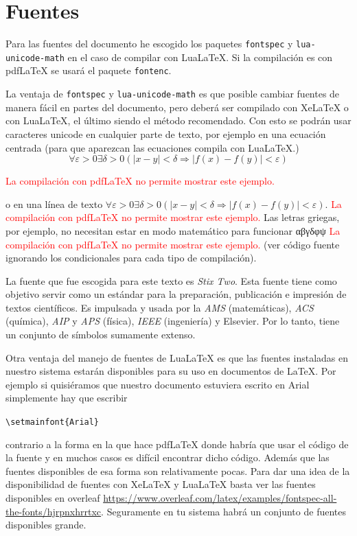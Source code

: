 
\chapter{Fuentes}
Para las fuentes del documento he escogido los paquetes \texttt{fontspec} y
\texttt{lua-unicode-math} en el caso de compilar con Lua\LaTeX. Si la
compilación es con pdf\LaTeX{} se usará el paquete \texttt{fontenc}.

La ventaja de \texttt{fontspec} y \texttt{lua-unicode-math} es que posible
cambiar fuentes de manera fácil en partes del documento, pero deberá ser
compilado con Xe\LaTeX{} o con Lua\LaTeX, el último siendo el método
recomendado. Con esto se podrán usar caracteres unicode en cualquier parte
de texto, por ejemplo en una ecuación centrada (para que aparezcan las
ecuaciones compila con Lua\LaTeX.)
\ifluatex%
\[
  ∀ε>0∃δ>0(|x-y|<δ ⇒ |f(x)-f(y)|<ε)
\]
\else
\ifpdftex%
\begin{center}
\textcolor{red}{La compilación con pdf\LaTeX{} no permite mostrar este
ejemplo.}
\end{center}
\fi
\fi
o en una línea de texto%
\ifluatex%
\(∀ε>0∃δ>0(|x-y|<δ ⇒ |f(x)-f(y)|<ε)\).
\else
\ifpdftex%
\textcolor{red}{La compilación con pdf\LaTeX{} no permite mostrar este
ejemplo.}
\fi
\fi
Las letras griegas, por ejemplo, no necesitan estar en modo matemático para
funcionar
\ifluatex%
αβγδφψ
\else
\ifpdftex%
\textcolor{red}{La compilación con pdf\LaTeX{} no permite mostrar este
ejemplo.}
\fi
\fi
(ver código fuente ignorando los condicionales para cada tipo de
compilación).

La fuente que fue escogida para este texto es \textit{Stix Two}. Esta fuente
tiene como objetivo servir como un estándar para la preparación, publicación
e impresión de textos científicos. Es impulsada y usada por la \textit{AMS}
(matemáticas), \textit{ACS} (química), \textit{AIP} y \textit{APS} (física),
\textit{IEEE} (ingeniería) y Elsevier. Por lo tanto, tiene un conjunto de
símbolos sumamente extenso.

Otra ventaja del manejo de fuentes de Lua\LaTeX{} es que las
fuentes instaladas en nuestro sistema estarán disponibles para su uso en
documentos de \LaTeX{}. Por ejemplo si quisiéramos que nuestro documento
estuviera escrito en Arial simplemente hay que escribir
\begin{flushleft}
  \verb|\setmainfont{Arial}|
\end{flushleft}
contrario a la forma en la que hace pdf\LaTeX{} donde habría que usar el
código de la fuente y en muchos casos es difícil encontrar dicho código.
Además que las fuentes disponibles de esa forma son relativamente pocas.
Para dar una idea de la disponibilidad de fuentes con Xe\LaTeX{} y
Lua\LaTeX{} basta ver las fuentes disponibles en overleaf \url{https://www.overleaf.com/latex/examples/fontspec-all-the-fonts/hjrpnxhrrtxc}.
Seguramente en tu sistema habrá un conjunto de fuentes disponibles grande.

